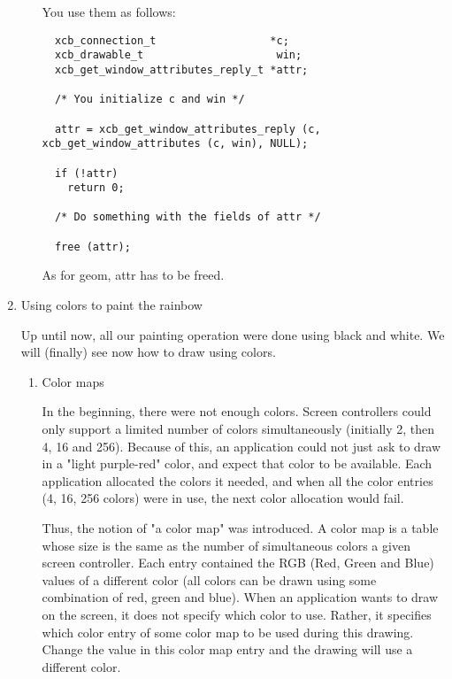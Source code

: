 \documentclass[12pt,oneside,titlepage]{book}
\begin{document}
\begin{enumerate}
\begin{enumerate}
    You use them as follows:

\begin{verbatim}
  xcb_connection_t                  *c;
  xcb_drawable_t                     win;
  xcb_get_window_attributes_reply_t *attr;

  /* You initialize c and win */

  attr = xcb_get_window_attributes_reply (c, xcb_get_window_attributes (c, win), NULL);

  if (!attr)
    return 0;

  /* Do something with the fields of attr */

  free (attr);
\end{verbatim}

    As for {geom}, {attr} has to be freed.
  \end{enumerate}
\item
  \protect\hypertarget{usecolor}{}{Using colors to paint the rainbow}

  Up until now, all our painting operation were done using black and
  white. We will (finally) see now how to draw using colors.

  \begin{enumerate}
  \item
    \protect\hypertarget{colormap}{}{Color maps}

    In the beginning, there were not enough colors. Screen controllers
    could only support a limited number of colors simultaneously
    (initially 2, then 4, 16 and 256). Because of this, an application
    could not just ask to draw in a "light purple-red" color, and expect
    that color to be available. Each application allocated the colors it
    needed, and when all the color entries (4, 16, 256 colors) were in
    use, the next color allocation would fail.

    Thus, the notion of "a color map" was introduced. A color map is a
    table whose size is the same as the number of simultaneous colors a
    given screen controller. Each entry contained the RGB (Red, Green
    and Blue) values of a different color (all colors can be drawn using
    some combination of red, green and blue). When an application wants
    to draw on the screen, it does not specify which color to use.
    Rather, it specifies which color entry of some color map to be used
    during this drawing. Change the value in this color map entry and
    the drawing will use a different color.


\end{enumerate}
\end{enumerate}
\end{document}
